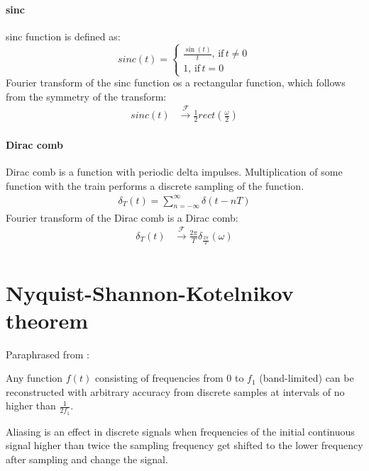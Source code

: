 \documentclass{article}
\begin{document}
\paragraph{sinc} sinc function is defined as:
\begin{equation*}
    sinc(t) = \begin{cases}
        \frac{\sin(t)}{t}, \, \text{if} \, t \ne 0 \\
        1, \, \text{if} \, t = 0\
    \end{cases} 
\end{equation*}
Fourier transform of the sinc function os a rectangular function, which follows from the symmetry of the transform:
\begin{align*}
    sinc(t) &\xrightarrow{\mathcal{F}} \frac{1}{2} rect(\frac{\omega}{2}) 
\end{align*}

\paragraph{Dirac comb} Dirac comb is a function with periodic delta impulses. 
Multiplication of some function with the train performs a discrete sampling of the function.
\begin{align*}
    \delta_{T}(t) = \sum \limits^{\infty}_{n = -\infty} \delta(t - nT)
\end{align*}
Fourier transform of the Dirac comb is a Dirac comb:
\begin{align*}
    \delta_{T}(t) &\xrightarrow{\mathcal{F}} \frac{2\pi}{T} \delta_{\frac{2 \pi}{T}}(\omega) \\
\end{align*}

\section{Nyquist-Shannon-Kotelnikov theorem}

Paraphrased from \cite{nyquist_certain_1928,shannon_communication_1949,kotelnikov_transmission_2006}:
\begin{displayquote}
Any function $f(t)$ consisting of frequencies from $0$ to $f_1$ (band-limited) can be 
reconstructed with arbitrary accuracy from discrete samples at intervals of no higher than $\frac{1}{2f_1}$.
\end{displayquote}

Aliasing is an effect in discrete signals when frequencies of the initial continuous signal higher than twice the sampling frequency
get shifted to the lower frequency after sampling and change the signal.
\end{document}
